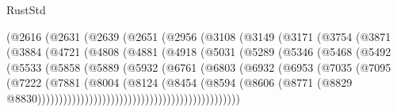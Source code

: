 \begin{lexlean}{RustStd}
\begin{coremodule}
                    (@2616
                      (@2631
                        (@2639
                          (@2651
                            (@2956
                              (@3108
                                (@3149
                                  (@3171
                                    (@3754
                                      (@3871
                                        (@3884
                                          (@4721
                                            (@4808
                                              (@4881
                                                (@4918
                                                  (@5031
                                                    (@5289
                                                      (@5346
                                                        (@5468
                                                          (@5492
                                                            (@5533
                                                              (@5858
                                                                (@5889
                                                                  (@5932
                                                                    (@6761
                                                                      (@6803
                                                                        (@6932
                                                                          (@6953
                                                                            (@7035
                                                                              (@7095
                                                                                (@7222
                                                                                  (@7881
                                                                                    (@8004
                                                                                      (@8124
                                                                                        (@8454
                                                                                          (@8594
                                                                                            (@8606
                                                                                              (@8771
                                                                                                (@8829
                                                                                                  @8830)))))))))))))))))))))))))))))))))))))))))))))))

\end{coremodule}
\end{lexlean}
